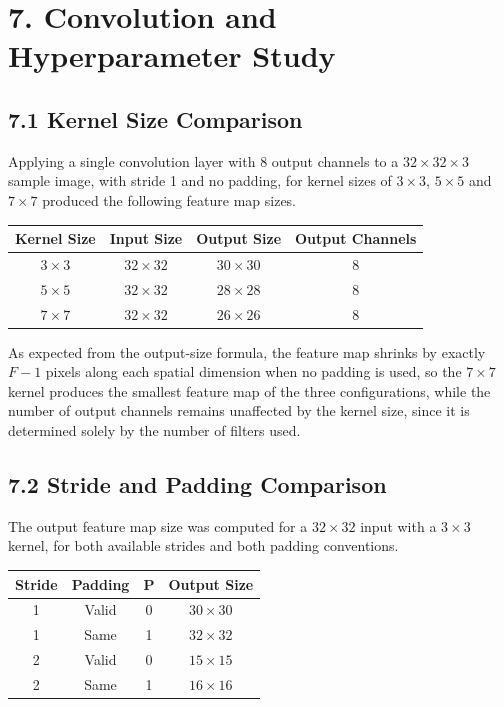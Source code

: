 \documentclass[11pt,a4paper]{article}
\begin{document}
\section*{7. Convolution and Hyperparameter Study}

\subsection*{7.1 Kernel Size Comparison}

Applying a single convolution layer with 8 output channels to a $32\times32\times3$ sample image, with stride 1 and no padding, for kernel sizes of $3\times3$, $5\times5$ and $7\times7$ produced the following feature map sizes.

\begin{center}
\begin{tabular}{|c|c|c|c|}
\hline
\textbf{Kernel Size} & \textbf{Input Size} & \textbf{Output Size} & \textbf{Output Channels}\\
\hline
$3\times3$ & $32\times32$ & $30\times30$ & 8\\
\hline
$5\times5$ & $32\times32$ & $28\times28$ & 8\\
\hline
$7\times7$ & $32\times32$ & $26\times26$ & 8\\
\hline
\end{tabular}
\end{center}

\vspace{0.15cm}

As expected from the output-size formula, the feature map shrinks by exactly $F-1$ pixels along each spatial dimension when no padding is used, so the $7\times7$ kernel produces the smallest feature map of the three configurations, while the number of output channels remains unaffected by the kernel size, since it is determined solely by the number of filters used.

\subsection*{7.2 Stride and Padding Comparison}

The output feature map size was computed for a $32\times32$ input with a $3\times3$ kernel, for both available strides and both padding conventions.

\begin{center}
\begin{tabular}{|c|c|c|c|}
\hline
\textbf{Stride} & \textbf{Padding} & \textbf{P} & \textbf{Output Size}\\
\hline
1 & Valid & 0 & $30\times30$\\
\hline
1 & Same & 1 & $32\times32$\\
\hline
2 & Valid & 0 & $15\times15$\\
\hline
2 & Same & 1 & $16\times16$\\
\hline
\end{tabular}
\end{center}
\end{document}
